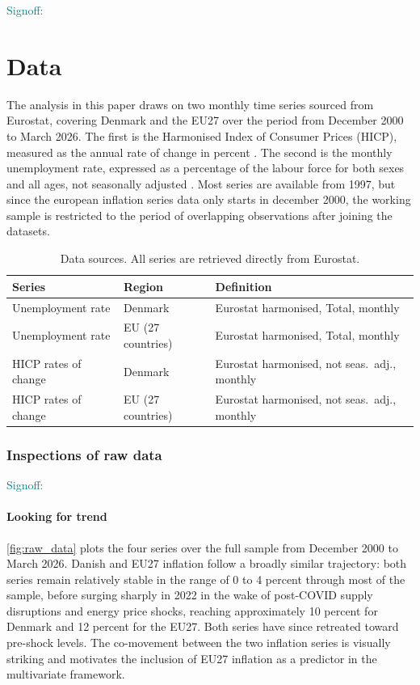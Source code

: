 \textcolor{teal}{Signoff:}\newline
\bigskip
\chapter{Data}\label{sec:data}
The analysis in this paper draws on two monthly time series sourced from Eurostat, covering Denmark and the EU27 over the period from December 2000 to March 2026. The first is the Harmonised Index of Consumer Prices (HICP), measured as the annual rate of change in percent \parencite{eurostat_hicp}. The second is the monthly unemployment rate, expressed as a percentage of the labour force for both sexes and all ages, not seasonally adjusted \parencite{eurostat_unemployment}. Most series are available from 1997, but since the european inflation series data only starts in december 2000, the working sample is restricted to the period of overlapping observations after joining the datasets.
\begin{table}[h!]
\centering
\begin{tabular}{lll}
\toprule
\textbf{Series} & \textbf{Region} & \textbf{Definition} \\
\midrule
Unemployment rate & Denmark & Eurostat harmonised, Total, monthly\\
Unemployment rate & EU (27 countries)  & Eurostat harmonised, Total, monthly\\
HICP rates of change & Denmark  & Eurostat harmonised, not seas.\ adj., monthly \\
HICP rates of change &  EU (27 countries)  & Eurostat harmonised, not seas.\ adj., monthly \\
\bottomrule
\end{tabular}
\caption{Data sources. All series are retrieved directly from Eurostat.}
\end{table}



\subsection{Inspections of raw data}
\textcolor{teal}{Signoff:}
\subsubsection{Looking for trend}
\ref{fig:raw_data} plots the four series over the full sample from December 2000 to March 2026. Danish and EU27 inflation follow a broadly similar trajectory: both series remain relatively stable in the range of 0 to 4 percent through most of the sample, before surging sharply in 2022 in the wake of post-COVID supply disruptions and energy price shocks, reaching approximately 10 percent for Denmark and 12 percent for the EU27. Both series have since retreated toward pre-shock levels. The co-movement between the two inflation series is visually striking and motivates the inclusion of EU27 inflation as a predictor in the multivariate framework.


